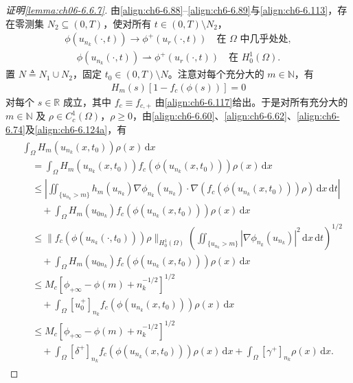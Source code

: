\documentclass[../../main.tex]{subfiles}%
\begin{document}
\begin{proof}[证明\cref{lemma:ch06-6.6.7}]
由\eqref{align:ch6-6.88}--\eqref{align:ch6-6.89}与\eqref{align:ch6-6.113}，存在零测集 $N_2\subseteq(0,T)$，使对所有 $t\in(0,T)\setminus N_2$，
\begin{align}
\phi(u_{n_k}(\cdot,t))\to\phi^+(u_r(\cdot,t)) \quad\text{在 }\Omega\text{ 中几乎处处}, \label{align:ch6-6.124a}
\end{align}
\begin{align}
\phi(u_{n_k}(\cdot,t))\rightharpoonup\phi^+(u_r(\cdot,t)) \quad\text{在 }H^1_0(\Omega). \label{align:ch6-6.124b}
\end{align}
置 $N\triangleq N_1\cup N_2$，固定 $t_0\in(0,T)\setminus N$。注意对每个充分大的 $m\in\mathbb{N}$，有
\begin{align*}
H_m(s)[1-f_c(\phi(s))]=0
\end{align*}
对每个 $s\in\mathbb{R}$ 成立，其中 $f_c\equiv f_{c,+}$ 由\eqref{align:ch6-6.117}给出。于是对所有充分大的 $m\in\mathbb{N}$ 及 $\rho\in C^1_c(\Omega)$，$\rho\geqslant0$，由\eqref{align:ch6-6.60}、\eqref{align:ch6-6.62}、\eqref{align:ch6-6.74}及\eqref{align:ch6-6.124a}，有
\begin{align*}
\begin{aligned}
&\int_\Omega H_m(u_{n_k}(x,t_0))\rho(x)\,\mathrm{d}x\\
&\quad=\int_\Omega H_m(u_{n_k}(x,t_0))f_c(\phi(u_{n_k}(x,t_0)))\rho(x)\,\mathrm{d}x\\
&\quad\leqslant\left|\iint_{\{u_{n_k}>m\}}h_m(u_{n_k})\nabla\phi_{n_k}(u_{n_k})\cdot
\nabla(f_c(\phi(u_{n_k}(x,t_0)))\rho)\,\mathrm{d}x\,\mathrm{d}t\right|\\
&\qquad+\int_\Omega H_m(u_{0n_k})f_c(\phi(u_{n_k}(x,t_0)))\rho(x)\,\mathrm{d}x\\
&\quad\leqslant\|f_c(\phi(u_{n_k}(\cdot,t_0)))\rho\|_{H^1_0(\Omega)}
\left(\iint_{\{u_{n_k}>m\}}|\nabla\phi_{n_k}(u_{n_k})|^2\,\mathrm{d}x\,\mathrm{d}t\right)^{1/2}\\
&\qquad+\int_\Omega H_m(u_{0n_k})f_c(\phi(u_{n_k}(x,t_0)))\rho(x)\,\mathrm{d}x\\
&\quad\leqslant M_c[\phi_{+\infty}-\phi(m)+n_k^{-1/2}]^{1/2}\\
&\qquad+\int_\Omega[u^+_0]_{n_k}f_c(\phi(u_{n_k}(x,t_0)))\rho(x)\,\mathrm{d}x\\
&\quad\leqslant M_c[\phi_{+\infty}-\phi(m)+n_k^{-1/2}]^{1/2}\\
&\qquad+\int_\Omega[\delta^+]_{n_k}f_c(\phi(u_{n_k}(x,t_0)))\rho(x)\,\mathrm{d}x
+\int_\Omega[\gamma^+]_{n_k}\rho(x)\,\mathrm{d}x.
\end{aligned}
\end{align*}

\end{proof}
\end{document}
